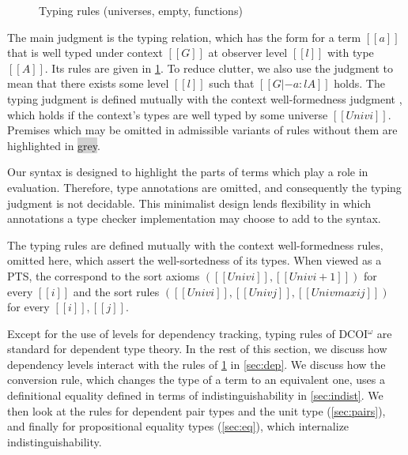 \documentclass[acmsmall]{acmart}
\makeatletter
\theoremstyle{linked}
\theoremstyle{deflinked}
\theoremstyle{acmdefinition}
\newcommand{\sw}[1]{}
\newcommand{\name}{\texorpdfstring{DCOI$^{\omega}$\@\xspace}{DCOI-omega}}
\newcommand{\judgement}[1]{{\setlength{\fboxsep}{1.5pt}\fbox{#1}}}
\makeatother
\begin{document}
\begin{figure}[h]
  \caption{Typing rules (universes, empty, functions)}
  \Description{}
  \label{fig:typing:dep}
\end{figure}

The main judgment is the typing relation,
which has the form \judgement{$[[G |- a : l A]]$} for a term $[[a]]$
that is well typed under context $[[G]]$ at observer level $[[l]]$
with type $[[A]]$.
Its rules are given in \cref{fig:typing:dep}.
To reduce clutter,
we also use the judgment \judgement{$[[G |- a : A]]$} to mean that there exists some level $[[l]]$
such that $[[G |- a : l A]]$ holds.
The typing judgment is defined mutually with the context well-formedness judgment \judgement{$[[|- G]]$},
which holds if the context's types are well typed by some universe $[[Univ i]]$.
Premises which may be omitted in admissible variants of rules without them
are highlighted in \colorbox{lightgray}{grey}.

Our syntax is designed to highlight the parts of terms which play a role in evaluation.
Therefore, type annotations are omitted,
and consequently the typing judgment is not decidable.
This minimalist design lends flexibility in which annotations
a type checker implementation may choose to add to the syntax.

\sw{We need to say up front that this typing judgment is not designed to be decidable as the
  syntax does not include enough annotations. We design it this way to highlight the relevant parts of
the terms. We also have flexibility in where we add annotations, none or relevant so we can add as many or as few as we need depending on how sophisticated we would like the type checking algorithm to be.}

The typing rules are defined mutually with the context well-formedness rules,
omitted here, which assert the well-sortedness of its types.
When viewed as a PTS, the  correspond
to the sort axioms $([[Univ i]], [[Univ i + 1]])$ for every $[[i]]$
and the sort rules $([[Univ i]], [[Univ j]], [[Univ max i j]])$ for every $[[i]], [[j]]$.

Except for the use of levels for dependency tracking, typing rules of \name
are standard for dependent type theory. In the rest of this section, we
discuss how dependency levels interact with the rules of \cref{fig:typing:dep}
in \cref{sec:dep}. We discuss how the conversion rule, which changes the type of a term to an equivalent one,
uses a definitional equality defined in terms of indistinguishability in \cref{sec:indist}.
We then look at the rules for dependent pair types and the unit type (\cref{sec:pairs}),
and finally for propositional equality types (\cref{sec:eq}),
which internalize indistinguishability.
\end{document}
